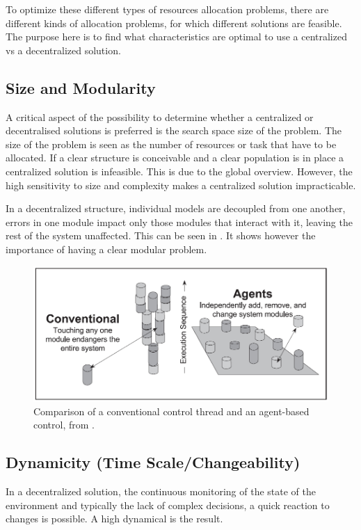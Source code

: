 To optimize these different types of resources allocation problems, there are different kinds of allocation problems, for which different solutions are feasible. The purpose here is to find what characteristics are optimal to use a centralized vs a decentralized solution.


\subsection{Size and Modularity}
A critical aspect of the possibility to determine whether a centralized or decentralised solutions is preferred is the search space size of the problem. The size of the problem is seen as the number of resources or task that have to be allocated.  If a clear structure is conceivable and a clear population is in place a centralized solution is infeasible. This is due to the global overview. However, the high sensitivity to size and complexity makes a centralized solution impracticable.

In a decentralized structure, individual models are decoupled from one another, errors in one module impact only those modules that interact with it, leaving the rest of the system unaffected. This can be seen in . It shows however the importance of having a clear modular problem. 

\begin{figure}[h]
\centering
\includegraphics[width=0.7\linewidth]{img/modularity+decentral-changeability}
\caption{Comparison of a conventional control thread and an agent-based control, from \citep{parunak1999industrial}.}
\label{fig:modularitydecentral-changeability}
\end{figure}



\subsection{Dynamicity (Time Scale/Changeability)}
In a decentralized solution, the continuous monitoring of the state of the environment and typically the lack of complex decisions, a quick reaction to changes is possible. A high dynamical is the result. 

